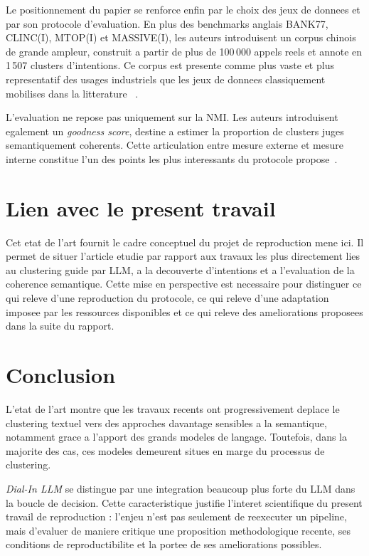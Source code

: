 Le positionnement du papier se renforce enfin par le choix des jeux de donnees
et par son protocole d'evaluation. En plus des benchmarks anglais BANK77,
CLINC(I), MTOP(I) et MASSIVE(I), les auteurs introduisent un corpus chinois de
grande ampleur, construit a partir de plus de 100\,000 appels reels et annote
en 1\,507 clusters d'intentions. Ce corpus est presente comme plus vaste et
plus representatif des usages industriels que les jeux de donnees classiquement
mobilises dans la litterature
~\cite{casanueva2020efficient,larson2019evaluation,fitzgerald2023massive,hong2025dialinllm}.

L'evaluation ne repose pas uniquement sur la NMI. Les auteurs introduisent
egalement un \emph{goodness score}, destine a estimer la proportion de clusters
juges semantiquement coherents. Cette articulation entre mesure externe et
mesure interne constitue l'un des points les plus interessants du protocole
propose~\cite{jerdee2024nmi,hong2025dialinllm}.

\section{Lien avec le present travail}

Cet etat de l'art fournit le cadre conceptuel du projet de reproduction mene
ici. Il permet de situer l'article etudie par rapport aux travaux les plus
directement lies au clustering guide par LLM, a la decouverte d'intentions et a
l'evaluation de la coherence semantique. Cette mise en perspective est
necessaire pour distinguer ce qui releve d'une reproduction du protocole, ce
qui releve d'une adaptation imposee par les ressources disponibles et ce qui
releve des ameliorations proposees dans la suite du rapport.

\section{Conclusion}

L'etat de l'art montre que les travaux recents ont progressivement deplace le
clustering textuel vers des approches davantage sensibles a la semantique,
notamment grace a l'apport des grands modeles de langage. Toutefois, dans la
majorite des cas, ces modeles demeurent situes en marge du processus de
clustering.

\emph{Dial-In LLM} se distingue par une integration beaucoup plus forte du LLM
dans la boucle de decision. Cette caracteristique justifie l'interet
scientifique du present travail de reproduction : l'enjeu n'est pas seulement
de reexecuter un pipeline, mais d'evaluer de maniere critique une proposition
methodologique recente, ses conditions de reproductibilite et la portee de ses
ameliorations possibles.
